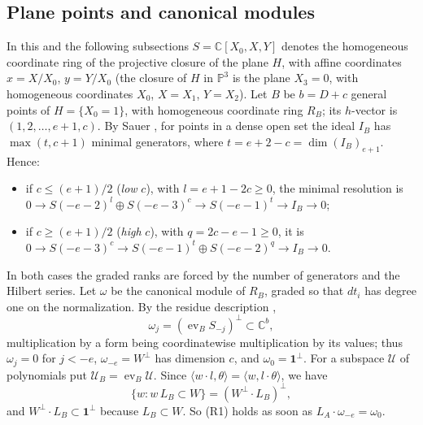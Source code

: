 \documentclass{amsart}
\theoremstyle{definition}
\theoremstyle{remark}
\numberwithin{equation}{section}
\newcommand{\CC}{\mathbb{C}}
\newcommand{\PP}{\mathbb{P}}
\DeclareMathOperator{\ev}{ev}
\begin{document}
\subsection{Plane points and canonical modules}\label{sec:R1}
In this and the following subsections $S=\CC[X_0,X,Y]$ denotes the homogeneous
coordinate ring of the projective closure of the plane $H$, with affine coordinates
$x=X/X_0$, $y=Y/X_0$ (the closure of $H$ in $\PP^3$ is the plane $X_3=0$, with homogeneous coordinates $X_0$, $X=X_1$, $Y=X_2$). Let $B$ be
$b=D+c$ general points of $H=\{X_0=1\}$, with homogeneous coordinate ring $R_B$; its $h$-vector is $(1,2,\dots,e+1,c)$.
By Sauer \cite[Proposition~1.7]{Sauer}, for points in a dense open set the ideal $I_B$
has $\max(t,c+1)$ minimal generators, where $t=e+2-c=\dim(I_B)_{e+1}$. Hence:
\begin{itemize}
\item if $c\le(e+1)/2$ (\emph{low} $c$), with $l=e+1-2c\ge0$, the minimal resolution is
$0\to S(-e-2)^l\oplus S(-e-3)^c\to S(-e-1)^t\to I_B\to0$;
\item if $c\ge(e+1)/2$ (\emph{high} $c$), with $q=2c-e-1\ge0$, it is
$0\to S(-e-3)^c\to S(-e-1)^t\oplus S(-e-2)^q\to I_B\to0$.
\end{itemize}
In both cases the graded ranks are forced by the number of generators and the Hilbert
series. Let $\omega$ be the canonical module of $R_B$, graded so that $dt_i$ has degree
one on the normalization. By the residue description \cite[Section~1.3.2]{Stevens},
\[
  \omega_j=(\ev_BS_{-j})^\perp\subset\CC^b ,
\]
multiplication by a form being coordinatewise multiplication by its values; thus
$\omega_j=0$ for $j<-e$, $\omega_{-e}=W^\perp$ has dimension $c$, and
$\omega_0=\mathbf1^\perp$. For a subspace $\mathcal U$ of polynomials put
$\mathcal U_B=\ev_B\mathcal U$. Since $\langle w\cdot l,\theta\rangle=\langle w,l\cdot\theta
\rangle$, we have
\begin{equation}\label{eq:R1dual}
  \{w:w\,L_B\subset W\}=(W^\perp\cdot L_B)^\perp ,
\end{equation}
and $W^\perp\cdot L_B\subset\mathbf1^\perp$ because $L_B\subset W$. So (R1) holds as soon
as $L_A\cdot\omega_{-e}=\omega_0$.
\end{document}
